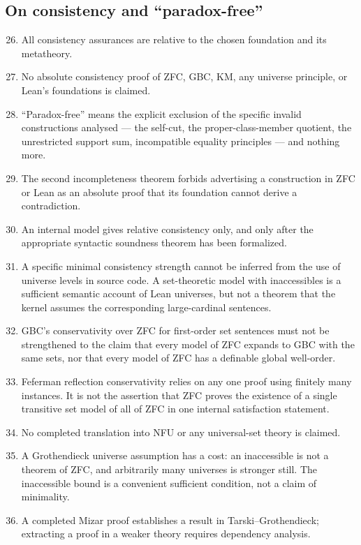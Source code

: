 \documentclass[11pt,letterpaper]{article}
\numberwithin{equation}{section}
\theoremstyle{definition}
\theoremstyle{remark}
\begin{document}
\subsection{On consistency and ``paradox-free''}
\label{found:app:limconsistency}
\begin{enumerate}\setcounter{enumi}{25}
\item All consistency assurances are relative to the chosen foundation and its
metatheory.
\item No absolute consistency proof of ZFC, GBC, KM, any universe principle, or
Lean's foundations is claimed.
\item ``Paradox-free'' means the explicit exclusion of the specific invalid
constructions analysed --- the self-cut, the proper-class-member quotient, the
unrestricted support sum, incompatible equality principles --- and nothing more.
\item The second incompleteness theorem forbids advertising a construction in
ZFC or Lean as an absolute proof that its foundation cannot derive a
contradiction.
\item An internal model gives relative consistency only, and only after the
appropriate syntactic soundness theorem has been formalized.
\item A specific minimal consistency strength cannot be inferred from the use of
universe levels in source code. A set-theoretic model with inaccessibles is a
sufficient semantic account of Lean universes, but not a theorem that the kernel
assumes the corresponding large-cardinal sentences.
\item GBC's conservativity over ZFC for first-order set sentences must not be
strengthened to the claim that every model of ZFC expands to GBC with the same
sets, nor that every model of ZFC has a definable global well-order.
\item Feferman reflection conservativity relies on any one proof using finitely
many instances. It is not the assertion that ZFC proves the existence of a single
transitive set model of all of ZFC in one internal satisfaction statement.
\item No completed translation into NFU or any universal-set theory is claimed.
\item A Grothendieck universe assumption has a cost: an inaccessible is not a
theorem of ZFC, and arbitrarily many universes is stronger still. The
inaccessible bound is a convenient sufficient condition, not a claim of
minimality.
\item A completed Mizar proof establishes a result in Tarski--Grothendieck;
extracting a proof in a weaker theory requires dependency analysis.
\end{enumerate}
\end{document}
